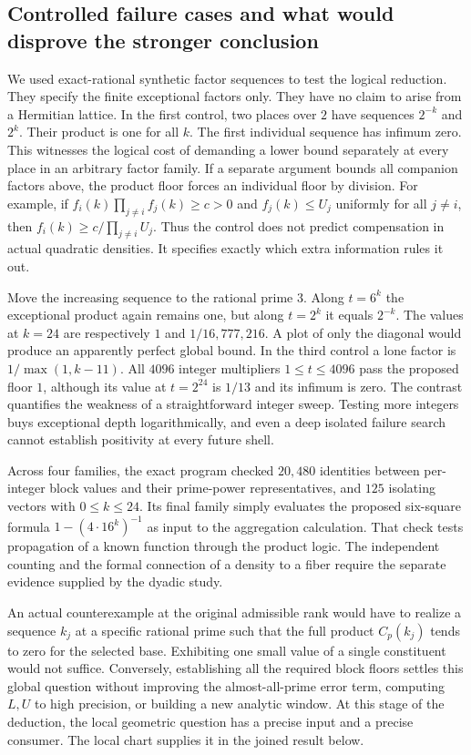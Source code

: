\documentclass[12pt,letterpaper]{article}
\begin{document}
\subsection{Controlled failure cases and what would disprove the stronger conclusion}

We used exact-rational synthetic factor sequences to test the logical reduction. They specify the finite exceptional factors only. They have no claim to arise from a Hermitian lattice. In the first control, two places over $2$ have sequences $2^{-k}$ and $2^k$. Their product is one for all $k$. The first individual sequence has infimum zero. This witnesses the logical cost of demanding a lower bound separately at every place in an arbitrary factor family. If a separate argument bounds all companion factors above, the product floor forces an individual floor by division. For example, if $f_i(k)\prod_{j\ne i}f_j(k)\geq c>0$ and $f_j(k)\leq U_j$ uniformly for all $j\ne i$, then $f_i(k)\geq c/\prod_{j\ne i} U_j$. Thus the control does not predict compensation in actual quadratic densities. It specifies exactly which extra information rules it out.

Move the increasing sequence to the rational prime $3$. Along $t=6^k$ the exceptional product again remains one, but along $t=2^k$ it equals $2^{-k}$. The values at $k=24$ are respectively $1$ and $1/16{,}777{,}216$. A plot of only the diagonal would produce an apparently perfect global bound. In the third control a lone factor is $1/\max(1,k-11)$. All $4096$ integer multipliers $1\leq t\leq4096$ pass the proposed floor $1$, although its value at $t=2^{24}$ is $1/13$ and its infimum is zero. The contrast quantifies the weakness of a straightforward integer sweep. Testing more integers buys exceptional depth logarithmically, and even a deep isolated failure search cannot establish positivity at every future shell.

Across four families, the exact program checked $20{,}480$ identities between per-integer block values and their prime-power representatives, and $125$ isolating vectors with $0\leq k\leq24$. Its final family simply evaluates the proposed six-square formula $1-(4\cdot16^k)^{-1}$ as input to the aggregation calculation. That check tests propagation of a known function through the product logic. The independent counting and the formal connection of a density to a fiber require the separate evidence supplied by the dyadic study.

An actual counterexample at the original admissible rank would have to realize a sequence $k_j$ at a specific rational prime such that the full product $C_p(k_j)$ tends to zero for the selected base. Exhibiting one small value of a single constituent would not suffice. Conversely, establishing all the required block floors settles this global question without improving the almost-all-prime error term, computing $L,U$ to high precision, or building a new analytic window. At this stage of the deduction, the local geometric question has a precise input and a precise consumer. The local chart supplies it in the joined result below.
\end{document}
